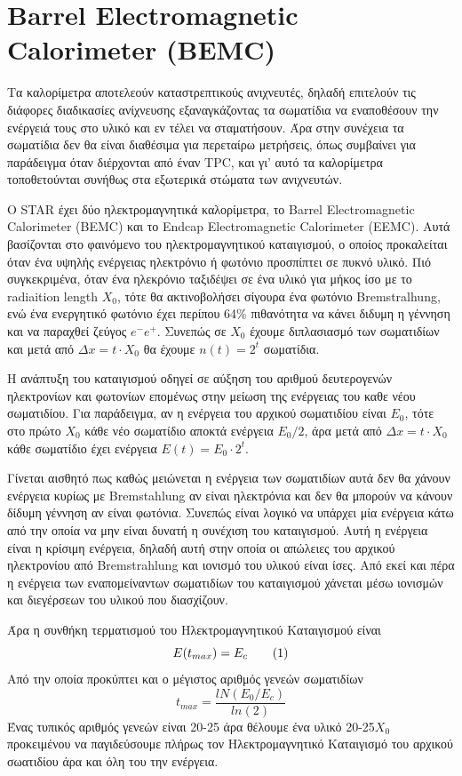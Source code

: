 \section{Barrel Electromagnetic Calorimeter (BEMC)}

	Τα καλορίμετρα αποτελεούν καταστρεπτικούς ανιχνευτές, δηλαδή επιτελούν τις διάφορες διαδικασίες ανίχνευσης εξαναγκάζοντας τα σωματίδια να εναποθέσουν την ενέργειά τους στο υλικό και εν τέλει να σταματήσουν. Άρα στην συνέχεια τα σωματίδια δεν θα είναι διαθέσιμα για περεταίρω μετρήσεις, όπως συμβαίνει για παράδειγμα όταν διέρχονται από έναν TPC, και γι' αυτό τα καλορίμετρα τοποθετούνται συνήθως στα εξωτερικά στώματα των ανιχνευτών. 
	
	Ο STAR έχει δύο ηλεκτρομαγνητικά καλορίμετρα, το Barrel Electromagnetic Calorimeter (BEMC) και το Endcap Electromagnetic Calorimeter (EEMC). Αυτά βασίζονται στο φαινόμενο του ηλεκτρομαγνητικού καταιγισμού, ο οποίος προκαλείται όταν ένα υψηλής ενέργειας ηλεκτρόνιο ή φωτόνιο προσπίπτει σε πυκνό υλικό. Πιό συγκεκριμένα, όταν ένα ηλεκρόνιο ταξιδέψει σε ένα υλικό για μήκος ίσο με το radiaition length $X_0$, τότε θα ακτινοβολήσει σίγουρα ένα φωτόνιο Bremstralhung, ενώ ένα ενεργητικό φωτόνιο έχει περίπου 64\% πιθανότητα να κάνει διδυμη η γέννηση και να παραχθεί ζεύγος $e^-e^+$. Συνεπώς σε $X_0$ έχουμε διπλασιασμό των σωματιδίων και μετά από $\Delta x = t\cdot X_0$ θα έχουμε $n(t) = 2^t$ σωματίδια. 
	
	Η ανάπτυξη του καταιγισμού οδηγεί σε αύξηση του αριθμού δευτερογενών ηλεκτρονίων και φωτονίων επομένως στην μείωση της ενέργειας του καθε νέου σωματιδίου. Για παράδειγμα, αν η ενέργεια του αρχικού σωματιδίου είναι $E_0$, τότε στο πρώτο $X_0$ κάθε νέο σωματίδιο αποκτά ενέργεια $E_0/2$, άρα μετά από $\Delta x = t\cdot X_0$ κάθε σωματίδιο έχει ενέργεια $E(t) = E_0\cdot 2^t$.
	
	Γίνεται αισθητό πως καθώς μειώνεται η ενέργεια των σωματιδίων αυτά δεν θα χάνουν ενέργεια κυρίως με Bremstahlung αν είναι ηλεκτρόνια και δεν θα μπορούν να κάνουν δίδυμη γέννηση αν είναι φωτόνια. Συνεπώς είναι λογικό να υπάρχει μία ενέργεια κάτω από την οποία να μην είναι δυνατή η συνέχιση του καταιγισμού. 
	Αυτή η ενέργεια είναι η κρίσιμη ενέργεια, δηλαδή αυτή στην οποία οι απώλειες του αρχικού ηλεκτρονίου από Bremstrahlung και ιονισμό του υλικού είναι ίσες. Από εκεί και πέρα η ενέργεια των εναπομείναντων σωματιδίων του καταιγισμού χάνεται μέσω ιονισμών και διεγέρσεων του υλικού που διασχίζουν.
	
	Άρα η συνθήκη τερματισμού του Ηλεκτρομαγνητικού Καταιγισμού είναι 
		\begin{equation*}\label{eq3.3}
			E(t_{max}) = E_c \numberthis
		\end{equation*}
	Από την οποία προκύπτει και ο μέγιστος αριθμός γενεών σωματιδίων 
		\begin{equation}\label{eq3.4}
			t_{max} = \frac{lN(E_0/E_c)}{ln(2)}
		\end{equation}
	Ένας τυπικός αριθμός γενεών είναι 20-25 άρα θέλουμε ένα υλικό 20-25$X_0$ προκειμένου να παγιδεύσουμε πλήρως τον Ηλεκτρομαγνητικό Καταιγισμό του αρχικού σωατιδίου άρα και όλη του την ενέργεια.
	
